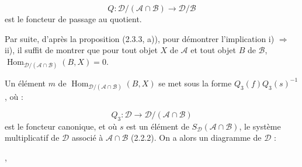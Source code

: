 \[
  Q\colon\mathcal D/(\mathcal A\cap\mathcal B)
  \longrightarrow\mathcal D/\mathcal B
\]
est le foncteur de passage au quotient.

Par suite, d'après la proposition (2.3.3, a)), pour démontrer l'implication
i) $\Rightarrow$ ii), il suffit de montrer que pour tout objet $X$ de
$\mathcal A$ et tout objet $B$ de $\mathcal B$,
$\operatorname{Hom}_{\mathcal D/(\mathcal A\cap\mathcal B)}(B,X)=0$.

Un élément $m$ de
$\operatorname{Hom}_{\mathcal D/(\mathcal A\cap\mathcal B)}(B,X)$ se met
sous la forme $Q_3(f)Q_3(s)^{-1}$, où :

\[
  Q_3\colon\mathcal D\longrightarrow
  \mathcal D/(\mathcal A\cap\mathcal B)
\]
est le foncteur canonique, et où $s$ est un élément de
$S_{\mathcal D}(\mathcal A\cap\mathcal B)$, le système multiplicatif de
$\mathcal D$ associé à $\mathcal A\cap\mathcal B$ (2.2.2). On a alors un
diagramme de $\mathcal D$ :

\begin{center}
  \quad ,
\end{center}
\endgroup
